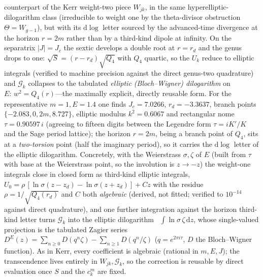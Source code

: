 \documentclass[12pt]{iopart}
\newcommand{\Jc}{J_{c}}
\newcommand{\dd}{\mathrm{d}}
\begin{document}
counterpart of the Kerr weight-two piece $W_{jk}$, in the same
hyperelliptic-dilogarithm class (irreducible to weight one by the theta-divisor
obstruction $\Theta=W_{g-1}$), but with its $\dd\log$ letter sourced by the
advanced-time divergence at the horizon $r=2m$ rather than by a third-kind dipole at
infinity. On the separatrix $|J|=\Jc$ the sextic develops a double root at $r=r_d$
and the genus drops to one: $\sqrt S=(r-r_d)\sqrt{Q_4}$ with $Q_4$ quartic, so the
$U_k$ reduce to elliptic integrals (verified to machine precision against the direct
genus-two quadrature) and $\mathcal{G}_k$ collapses to the tabulated \emph{elliptic
(Bloch--Wigner) dilogarithm} on $E:\,w^2=Q_4(r)$---the maximally explicit, directly
reusable form. For the representative $m=1,E=1.4$ one finds $\Jc=7.0266$,
$r_d=-3.3637$, branch points $\{-2.083,0,2m,8.727\}$, elliptic modulus $k^2=0.6067$
and rectangular nome $\tau=0.90597\,i$ (agreeing to fifteen digits between the
Legendre form $\tau=iK'/K$ and the Sage period lattice); the horizon $r=2m$, being a
branch point of $Q_4$, sits at a \emph{two-torsion} point (half the imaginary
period), so it carries the $\dd\log$ letter of the elliptic dilogarithm. Concretely,
with the Weierstrass $\sigma,\zeta$ of $E$ (built from $\tau$ with base at the
Weierstrass point, so the involution is $z\to-z$) the weight-one integrals close in
closed form as third-kind elliptic integrals,
$U_0=\rho\,[\ln\sigma(z-z_d)-\ln\sigma(z+z_d)]+Cz$ with the residue
$\rho=1/\sqrt{Q_4(r_d)}$ and $C$ both \emph{algebraic} (derived, not fitted; verified
to $10^{-14}$ against direct quadrature), and one further integration against the
horizon third-kind letter turns $\mathcal{G}_k$ into the elliptic
dilogarithm~\cite{Bloch2000,BeilinsonLevin1994}
$\int\ln\sigma\,\zeta\,\dd z$, whose single-valued projection is the tabulated
Zagier series~\cite{Zagier1990}
$D^E(z)=\sum_{n\ge0}D(q^n\zeta)-\sum_{n\ge1}D(q^n/\zeta)$
($q=e^{2\pi i\tau}$, $D$ the Bloch--Wigner function). As in Kerr, every coefficient is
algebraic (rational in $m,E,J$); the transcendence lives entirely in
$W_{jk},\mathcal{G}_k$, so the correction is reusable by direct evaluation once $S$
and the $c_k^m$ are fixed.
\end{document}
